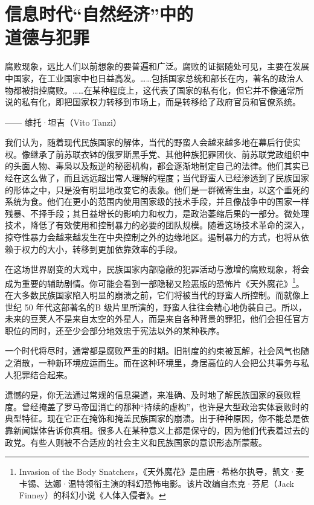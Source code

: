 \chapter[信息时代的道德与犯罪]{信息时代“自然经济”中的\\道德与犯罪}

\begin{tcolorbox}
\kaishu 腐败现象，远比人们以前想象的要普遍和广泛。腐败的证据随处可见，主要在发展中国家，在工业国家中也日益高发。……包括国家总统和部长在内，著名的政治人物都被指控腐败。……在某种程度上，这代表了国家的私有化，但它并不像通常所说的私有化，即把国家权力转移到市场上，而是转移给了政府官员和官僚系统。
\begin{flushright}
—— 维托·坦吉（Vito Tanzi）
\end{flushright}
\end{tcolorbox}


我们认为，随着现代民族国家的解体，当代的野蛮人会越来越多地在幕后行使实权。像继承了前苏联衣钵的俄罗斯黑手党、其他种族犯罪团伙、前苏联党政组织中的头面人物、毒枭以及叛逆的秘密机构，都会逐渐地制定自己的法律。他们其实已经在这么做了，而且远远超出常人理解的程度；当代野蛮人已经渗透到了民族国家的形体之中，只是没有明显地改变它的表象。他们是一群微寄生虫，以这个垂死的系统为食。他们在更小的范围内使用国家级的技术手段，并且像战争中的国家一样残暴、不择手段；其日益增长的影响力和权力，是政治萎缩后果的一部分。微处理技术，降低了有效使用和控制暴力的必要的团队规模。随着这场技术革命的深入，掠夺性暴力会越来越发生在中央控制之外的边缘地区。遏制暴力的方式，也将从依赖于权力的大小，转移到更加依靠效率的手段。

在这场世界剧变的大戏中，民族国家内部隐蔽的犯罪活动与激增的腐败现象，将会成为重要的辅助剧情。你可能会看到一部隐秘又险恶版的恐怖片《天外魔花》\footnote{Invasion of the Body Snatchers，《天外魔花》是由唐·希格尔执导，凯文·麦卡锡、达娜·温特领衔主演的科幻恐怖电影。该片改编自杰克·芬尼（Jack Finney）的科幻小说《人体入侵者》。}。在大多数民族国家陷入明显的崩溃之前，它们将被当代的野蛮人所控制。而就像上世纪 50 年代这部著名的B 级片里所演的，野蛮人往往会精心地伪装自己。所以，未来的豆荚人不是来自太空的外星人，而是来自各种背景的罪犯，他们会担任官方职位的同时，还至少会部分地效忠于宪法以外的某种秩序。

一个时代将尽时，通常都是腐败严重的时期。旧制度的约束被瓦解，社会风气也随之消散，一种新环境应运而生。而在这种环境里，身居高位的人会把公共事务与私人犯罪结合起来。

遗憾的是，你无法通过常规的信息渠道，来准确、及时地了解民族国家的衰败程度。曾经掩盖了罗马帝国消亡的那种“持续的虚构”，也许是大型政治实体衰败时的典型特征。现在它正在掩饰和掩盖民族国家的崩溃。出于种种原因，你不能总是依靠新闻媒体告诉你真相。很多人在某种意义上都是保守的，因为他们代表着过去的政党。有些人则被不合适应的社会主义和民族国家的意识形态所蒙蔽。

